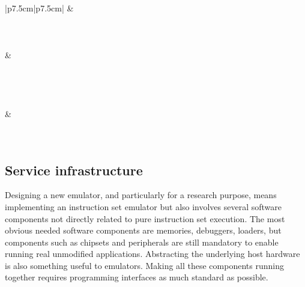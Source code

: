 \begin{center}
\begin{supertabular}{|p{7.5cm}|p{7.5cm}|}
		\hline
		 & \\
		\\
		\\
		\\
		\hline
		 & \\
		\\
		\\
		\\
		\hline
		\hline
		\\
		\hline
		 & \\
		\\
		\\
		\hline
	\end{supertabular}
\end{center}

\subsection{Service infrastructure}
\label{tms320c3x_service_infrastructure}

Designing a new emulator, and particularly for a research purpose, means implementing an instruction set emulator but also involves several software components not directly related to pure instruction set execution.
The most obvious needed software components are memories, debuggers, loaders, but components such as chipsets and peripherals are still mandatory to enable running real unmodified applications.
Abstracting the underlying host hardware is also something useful to emulators.
Making all these components running together requires programming interfaces as much standard as possible.

